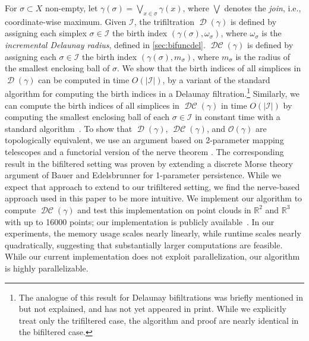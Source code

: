 \documentclass[11pt]{amsart}
\newcommand{\R}{\mathbb{R}} %
\DeclareMathOperator{\Del}{\mathcal{D}}
\DeclareMathOperator{\DelCech}{\mathcal{DC}}
\newcommand{\Offset}[0]{\mathcal{O}}
\newcommand{\Incr}[0]{\mathcal{I}}
\theoremstyle{plain}
\theoremstyle{definition}
\theoremstyle{remark}
\begin{document}
%
For $\sigma\subset X$ non-empty, let $\gamma(\sigma)=\bigvee_{x\in \sigma} \gamma(x)$, where $\bigvee$ denotes the \emph{join}, i.e., coordinate-wise maximum. 
Given $\Incr$, the trifiltration $\Del(\gamma)$ is defined by assigning each simplex $\sigma \in \Incr$ the birth index $(\gamma(\sigma), \omega_{\sigma})$, where $\omega_\sigma$ is the \emph{incremental Delaunay radius}, defined in \cref{sec:bifuncdel}.
$\DelCech(\gamma)$ is defined by assigning each $\sigma \in \Incr$ the birth index $(\gamma(\sigma), m_\sigma)$, where $m_\sigma$ is the radius of the smallest enclosing ball of $\sigma$.  We show that the birth indices of all simplices in $\Del(\gamma)$ can be computed in time $O(|\Incr|)$, by a variant of the standard algorithm for computing the birth indices in a Delaunay filtration.\footnote{The analogue of this result for Delaunay bifiltrations was briefly mentioned in \cite{alonsoDelaunayBifiltrationsFunctions2024} but not explained, and has not yet appeared in print.  While we explicitly treat only the trifiltered case, the algorithm and proof are nearly identical in the bifiltered case.}  Similarly, we can compute the birth indices of all simplices in $\DelCech(\gamma)$ in time $O(|\Incr|)$ by computing the smallest enclosing ball of each $\sigma\in\Incr$ in constant time with a standard algorithm~\cite{fischerFastSmallestEnclosingBallComputation2003,fischerSmallestEnclosingBall2004,cgal:fghhs-bv-24a}.  
%
To show that $\Del(\gamma)$, $\DelCech(\gamma)$, and $\Offset(\gamma)$ are topologically equivalent, we use an argument based on 2-parameter mapping telescopes and a functorial version of the nerve theorem \cite{bauerUnifiedViewFunctorial2023}.  The corresponding result in the bifiltered setting \cite[Corollary 3.4]{alonsoDelaunayBifiltrationsFunctions2024} was proven by extending a discrete Morse theory argument of Bauer and Edelsbrunner \cite{bauer2017morse} for 1-parameter persistence.  While we expect that approach to extend to our trifiltered setting, we find the nerve-based approach used in this paper to be more intuitive. %
%
We implement our algorithm to compute $\DelCech(\gamma)$ and test this implementation on point clouds in $\R^2$ and $\R^{3}$ with up to 16000 points; our implementation is publicly available~\cite{function_delaunay}.    In our experiments, the memory usage scales nearly linearly, while runtime scales nearly quadratically, suggesting that substantially larger computations are feasible.  While our current implementation does not exploit parallelization, our algorithm is highly parallelizable.
\end{document}
